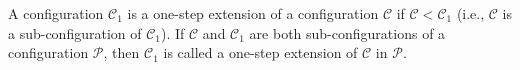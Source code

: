 A configuration $\mathcal{C}_1$ is a one-step extension of a configuration $\mathcal{C}$ if $\mathcal{C} < \mathcal{C}_1$ (i.e., $\mathcal{C}$ is a sub-configuration of $\mathcal{C}_1$). If $\mathcal{C}$ and $\mathcal{C}_1$ are both sub-configurations of a configuration $\mathcal{P}$, then $\mathcal{C}_1$ is called a one-step extension of $\mathcal{C}$ in $\mathcal{P}$.
